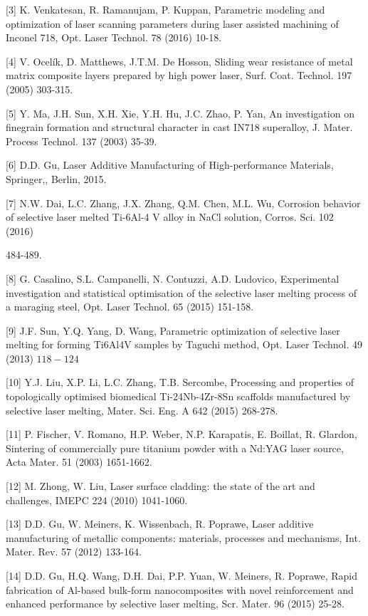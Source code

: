 \documentclass[10pt]{article}
\begin{document}
[3] K. Venkatesan, R. Ramanujam, P. Kuppan, Parametric modeling and optimization of laser scanning parameters during laser assisted machining of Inconel 718, Opt. Laser Technol. 78 (2016) 10-18.

[4] V. Ocelík, D. Matthews, J.T.M. De Hosson, Sliding wear resistance of metal matrix composite layers prepared by high power laser, Surf. Coat. Technol. 197 (2005) 303-315.

[5] Y. Ma, J.H. Sun, X.H. Xie, Y.H. Hu, J.C. Zhao, P. Yan, An investigation on finegrain formation and structural character in cast IN718 superalloy, J. Mater. Process Technol. 137 (2003) 35-39.

[6] D.D. Gu, Laser Additive Manufacturing of High-performance Materials, Springer,, Berlin, 2015.

[7] N.W. Dai, L.C. Zhang, J.X. Zhang, Q.M. Chen, M.L. Wu, Corrosion behavior of selective laser melted Ti-6Al-4 V alloy in NaCl solution, Corros. Sci. 102 (2016)

484-489.

[8] G. Casalino, S.L. Campanelli, N. Contuzzi, A.D. Ludovico, Experimental investigation and statistical optimisation of the selective laser melting process of a maraging steel, Opt. Laser Technol. 65 (2015) 151-158.

[9] J.F. Sun, Y.Q. Yang, D. Wang, Parametric optimization of selective laser melting for forming Ti6Al4V samples by Taguchi method, Opt. Laser Technol. 49 (2013) $118-124$

[10] Y.J. Liu, X.P. Li, L.C. Zhang, T.B. Sercombe, Processing and properties of topologically optimised biomedical Ti-24Nb-4Zr-8Sn scaffolds manufactured by selective laser melting, Mater. Sci. Eng. A 642 (2015) 268-278.

[11] P. Fischer, V. Romano, H.P. Weber, N.P. Karapatis, E. Boillat, R. Glardon, Sintering of commercially pure titanium powder with a Nd:YAG laser source, Acta Mater. 51 (2003) 1651-1662.

[12] M. Zhong, W. Liu, Laser surface cladding: the state of the art and challenges, IMEPC 224 (2010) 1041-1060.

[13] D.D. Gu, W. Meiners, K. Wissenbach, R. Poprawe, Laser additive manufacturing of metallic components: materials, processes and mechanisms, Int. Mater. Rev. 57 (2012) 133-164.

[14] D.D. Gu, H.Q. Wang, D.H. Dai, P.P. Yuan, W. Meiners, R. Poprawe, Rapid fabrication of Al-based bulk-form nanocomposites with novel reinforcement and enhanced performance by selective laser melting, Scr. Mater. 96 (2015) 25-28.
\end{document}
